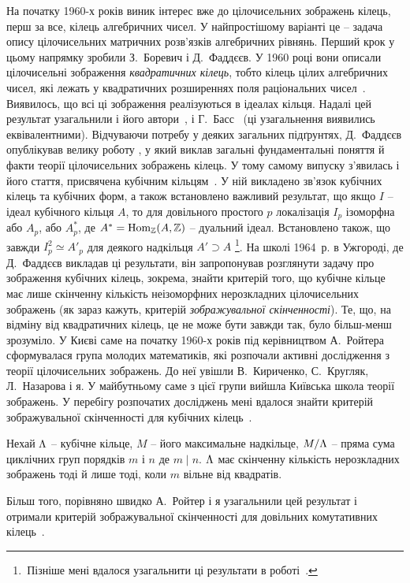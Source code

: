 На початку 1960-х років виник інтерес вже до цілочисельних зображень кілець, перш за все, кілець алгебричних чисел. 
У найпростішому варіанті це -- задача опису цілочисельних матричних розв'язків алгебричних рівнянь. 
Перший крок у цьому напрямку зробили З.~Боревич і Д.~Фаддєєв.
У 1960 році вони описали цілочисельні зображення \emph{квадратичних кілець}, тобто кілець цілих алгебричних чисел, які лежать у квадратичних розширеннях поля раціональних чисел~\cite{BF1}. 
Виявилось, що всі ці зображення реалізуються в ідеалах кільця. 
Надалі цей результат узагальнили і його автори~\cite{BFcyc}, і Г.~Басс~\cite{Bass} (ці узагальнення виявились еквівалентними). 
Відчуваючи потребу у деяких загальних підґрунтях, Д.~Фаддєєв опублікував велику роботу \cite{F1}, у який виклав загальні фундаментальні поняття й факти теорії цілочисельних зображень кілець. 
У тому самому випуску з'явилась і його стаття, присвячена кубічним кільцям~\cite{Fcub}. 
У ній викладено зв'язок кубічних кілець та кубічних форм, а також встановлено важливий результат, що якщо $I$ -- ідеал кубічного кільця $A$, то для довільного простого $p$ локалізація $I_p$ ізоморфна або $A_p$, або $A^*_p$, де $A^*=\mathop\mathrm{Hom}\nolimits_{\mathbb{Z}}(A,\mathbb{Z})$ -- дуальний ідеал. Встановлено також, що завжди $I^2_p\simeq A'_p$ для деякого надкільця $A'\supset A$%
\footnote{\,Пізніше мені вдалося узагальнити ці результати в роботі~\cite{ideals}.}.
На школі 1964~р. в Ужгороді, де Д.~Фаддєєв викладав ці результати, він запропонував розглянути задачу про зображення кубічних кілець, зокрема, знайти критерій того, що кубічне кільце має лише скінченну кількість неізоморфних нерозкладних цілочисельних зображень (як зараз кажуть, критерій \emph{зображувальної скінченності}). 
Те, що, на відміну від квадратичних кілець, це не може бути завжди так, було більш-менш зрозуміло. 
У Києві саме на початку 1960-х років під керівництвом А.~Ройтера сформувалася група молодих математиків, які розпочали активні дослідження з теорії цілочисельних зображень. 
До неї увішли В.~Кириченко, С.~Кругляк, Л.~Назарова і я.
У майбутньому саме з цієї групи вийшла Київська школа теорії зображень. 
У перебігу розпочатих досліджень мені вдалося знайти критерій зображувальної скінченності для кубічних кілець~\cite{cubic}.
\begin{theorem}
Нехай $\Lambda$ -- кубічне кільце, $M$ -- його максимальне надкільце, $M/\Lambda$ -- пряма сума циклічних груп порядків $m$ і $n$ де $m\mid n$.
$\Lambda$ має скінченну кількість нерозкладних зображень тоді й лише тоді, коли $m$ вільне від квадратів.
\end{theorem}
Більш того, порівняно швидко А.~Ройтер і я узагальнили цей результат і отримали критерій зображувальної скінченності для довільних комутативних кілець~\cite{DR}.
